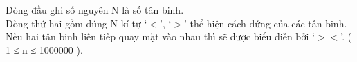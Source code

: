 Dòng đầu ghi số nguyên N là số tân binh.   
\\   Dòng thứ hai gồm đúng N kí tự ‘$<$’, ‘$>$’ thể hiện cách đứng của các tân binh. Nếu hai tân binh liên tiếp quay mặt vào nhau thì sẽ được biểu diễn bởi ‘$>$$<$’. ( 1 ≤ n ≤ 1000000 ).  

\